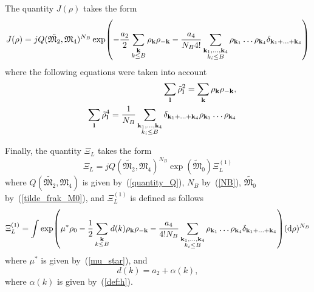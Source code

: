 The quantity $J(\rho)$ takes the form
\begin{equation}
	J(\rho) = j Q(\tilde{\mathfrak{M}_2}, \mathfrak{M}_4)^{N_B}
	\exp(-\frac{a_2}{2}\sum_{\substack{\vb k \\ k \leq B}} \rho_{\vb k}\rho_{-{\vb k}} 
	- \frac{a_4}{N_B 4!} \sum_{\substack{\vb k_1, \dotsc, \vb k_4 \\ k_i \leq B}} \rho_{\vb k_1} \dotsc \rho_{\vb k_4} \delta_{\vb{k}_1 + \dotsc + \vb{k}_4} )
\end{equation}
where the following equations were taken into account
\begin{eqnarray}
	&&\sum_{\vb l}\tilde{\rho}_{\vb l}^2 = \sum_{\vb k}\rho_{\vb k} \rho_{-\vb k},
	\\
	&&\sum_{\vb l}\tilde{\rho}_{\vb l}^4 = \frac{1}{N_B}\sum\limits_{\substack{\vb{k}_1,\dotsc,\vb{k}_4 \\ {k_i \le B}}}
	\delta_{\vb{k}_1 + \dotsc + \vb{k}_4} 
	\rho_{{\vb k}_1} \dots \rho_{{\vb k}_4}
\end{eqnarray}

Finally, the quantity $\Xi_L$ takes the form
\begin{equation}
	\label{Xi_L}
	\Xi_L = jQ(\tilde{\mathfrak{M}_2}, \mathfrak{M}_4)^{N_B} \exp(\tilde{\mathfrak{M}}_0) \Xi_L^{(1)}
\end{equation}
where $Q(\tilde{\mathfrak{M}_2}, \mathfrak{M}_4)$ is given by~(\ref{quantity_Q}), $N_B$ by~(\ref{NB}), $\tilde{\mathfrak{M}_0}$ by~(\ref{tilde_frak_M0}), and $\Xi_L^{(1)}$ is defined as follows
\begin{equation}
	\label{Xi_L_1}
	\Xi_L^{(1)} = \int \exp(\mu^* \rho_0 - \frac{1}{2} \sum_{\substack{\vb k \\ k \leq B}} d(k) \rho_{\vb k} \rho_{-\vb k} - \frac{a_4}{4! N_B} \sum_{\substack{\vb k_1, \dotsc, \vb k_4 \\ k_i \leq B}} \rho_{\vb k_1} \dotsc \rho_{\vb k_4} \delta_{\vb{k}_1 + \dotsc + \vb{k}_4} ) ({\rm d} \rho)^{N_B}
\end{equation}
where $\mu^*$ is given by~(\ref{mu_star}), and 
\begin{equation}
	d(k) = a_2 + \alpha(k),
\end{equation}
where $\alpha(k)$ is given by~(\ref{def:h}).

